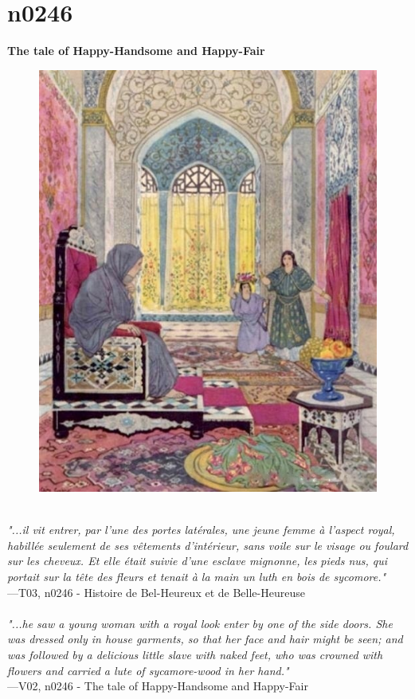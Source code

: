 \documentclass[../Carre_nights.tex]{subfiles}
\begin{document}
\newpage

\section{n0246}
\textbf{\Large{The tale of Happy-Handsome and Happy-Fair}} \\

\begin{figure}[ht]
\centering
\includegraphics[height=\figsize]{illustrations/volume_3/T03, n0246 - Histoire de Bel-Heureux et de Belle-Heureuse.jpg}
\end{figure}

\textit{\\
"...il vit entrer, par l’une des portes latérales, une jeune femme à l’aspect royal, habillée seulement de ses vêtements d’intérieur, sans voile sur le visage ou foulard sur les cheveux. Et elle était suivie d’une esclave mignonne, les pieds nus, qui portait sur la tête des fleurs et tenait à la main un luth en bois de sycomore."} \\
—T03, n0246 - Histoire de Bel-Heureux et de Belle-Heureuse \\~\\
\textit{"...he saw a young woman with a royal look enter by one of the side doors. She was dressed only in house garments, so that her face and hair might be seen; and was followed by a delicious little slave with naked feet, who was crowned with flowers and carried a lute of sycamore-wood in her hand."} \\
—V02, n0246 - The tale of Happy-Handsome and Happy-Fair
\end{document}
